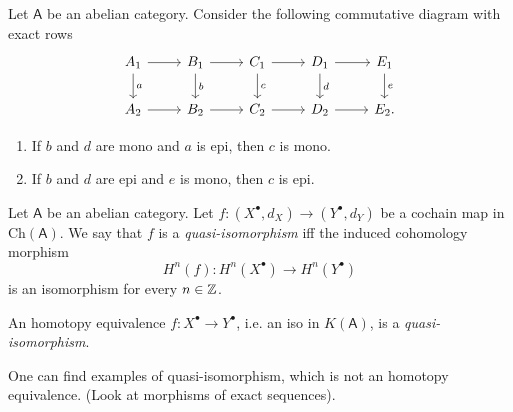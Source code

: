 \begin{lem}[$5$ lemma]
	Let $\mathsf{A}$ be an abelian category.
	Consider the following commutative diagram with exact rows
	\begin{equation}
	\begin{tikzcd}
		A_1 \arrow[r, "", rightarrow] \arrow[d, "a", rightarrow] &
		B_1 \arrow[r, "", rightarrow] \arrow[d, "b", rightarrow] &
		C_1 \arrow[r, "", rightarrow] \arrow[d, "c", rightarrow] &
		D_1 \arrow[r, "", rightarrow] \arrow[d, "d", rightarrow] &
		E_1 \arrow[d, "e", rightarrow] \\
		A_2 \arrow[r, "", rightarrow] &
		B_2 \arrow[r, "", rightarrow] &
		C_2 \arrow[r, "", rightarrow] &
		D_2 \arrow[r, "", rightarrow] &
		E_2 
	.\end{tikzcd}
	\end{equation} 
	\begin{enumerate}
		\item If $b$ and $d$ are mono and $a$ is epi, then $c$ is mono.
		\item If $b$ and $d$ are epi and $e$ is mono, then $c$ is epi.
	\end{enumerate}
\end{lem} 

\begin{defn}
	Let $\mathsf{A}$ be an abelian category.
	Let $f\colon \left( X^{\bullet}, d_{X} \right) \to \left( Y^{\bullet}, d_{Y} \right)$ be a cochain map in $\mathrm{Ch}(\mathsf{A})$.
	We say that $f$ is a {\em quasi-isomorphism} iff the induced cohomology morphism
	\begin{equation}
		H^n(f)\colon H^n(X^\bullet) \to H^n(Y^\bullet)
	\end{equation} 
	is an isomorphism for every $n \in \mathbb{Z}$.
\end{defn}

\begin{lem}
	An homotopy equivalence $f\colon X^\bullet \to Y^\bullet$, i.e.
	an iso in $K(\mathsf{A})$, is a {\em quasi-isomorphism}.
\end{lem} 

\begin{lem}
	One can find examples of quasi-isomorphism, which is not an homotopy equivalence.
	(Look at morphisms of exact sequences).
\end{lem} 

